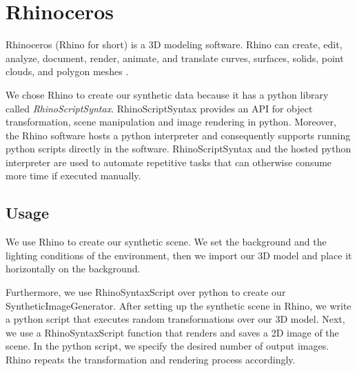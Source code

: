 \section{Rhinoceros}
Rhinoceros (Rhino for short) is a 3D modeling software. Rhino can create, edit, analyze, document, render, animate, and translate curves, surfaces, solids, point clouds, and polygon meshes \cite{rhino}.

We chose Rhino to create our synthetic data because it has a python library called \textit{RhinoScriptSyntax}. RhinoScriptSyntax provides an API for object transformation, scene manipulation and image rendering in python. Moreover, the Rhino software hosts a python interpreter and consequently supports running python scripts directly in the software. RhinoScriptSyntax and the hosted python interpreter are used to automate repetitive tasks that can otherwise consume more time if executed manually.

\subsection{Usage}
We use Rhino to create our synthetic scene. We set the background and the lighting conditions of the environment, then we import our 3D model and place it horizontally on the background.

Furthermore, we use RhinoSyntaxScript over python to create our SyntheticImageGenerator. After setting up the synthetic scene in Rhino, we write a python script that executes random transformations over our 3D model. Next, we use a RhinoSyntaxScript function that renders and saves a 2D image of the scene. In the python script, we specify the desired number of output images. Rhino repeats the transformation and rendering process accordingly.
